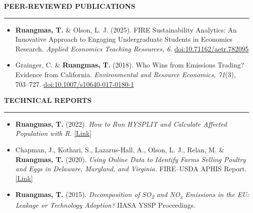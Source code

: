 \documentclass[11pt,letterpaper]{article}
\renewcommand{\section}[1]{%
  \par\vspace{10pt}%
  {\large\bfseries\color{accent}#1}\par\vspace{-3pt}%
  {\color{accent}\rule{\linewidth}{0.6pt}}\par\vspace{4pt}}
\newcommand{\pubentry}[1]{\item #1}
\begin{document}
\section{PEER-REVIEWED PUBLICATIONS}
\begin{itemize}
  \pubentry{\textbf{Ruangmas, T.} \& Olson, L. J. (2025). FIRE Sustainability Analytics: An Innovative Approach to Engaging Undergraduate Students in Economics Research. \textit{Applied Economics Teaching Resources, 6}. \href{https://doi.org/10.71162/aetr.782095}{doi:10.71162/aetr.782095}}
  \pubentry{Grainger, C. \& \textbf{Ruangmas, T.} (2018). Who Wins from Emissions Trading? Evidence from California. \textit{Environmental and Resource Economics, 71}(3), 703--727. \href{https://doi.org/10.1007/s10640-017-0180-1}{doi:10.1007/s10640-017-0180-1}}
\end{itemize}

\section{TECHNICAL REPORTS}
\begin{itemize}

\pubentry{\textbf{Ruangmas, T.} (2022). \textit{How to Run HYSPLIT and Calculate Affected Population with R.} 
\href{https://ruangmas.github.io/hysplit.html}{[Link]}} 

  \pubentry{Chapman, J., Kothari, S., Lazarus-Hall, A., Olson, L. J., Relan, M. \& \textbf{Ruangmas, T.} (2020). \textit{Using Online Data to Identify Farms Selling Poultry and Eggs in Delaware, Maryland, and Virginia.} FIRE--USDA APHIS Report. \href{https://drive.google.com/file/d/1tEazLXx8xA6s9KPVHxVDIlz273T3Oy9N/view?usp=drive_link}{[Link]}}
  \pubentry{\textbf{Ruangmas, T.} (2015). \textit{Decomposition of SO\textsubscript{2} and NO\textsubscript{x} Emissions in the EU: Leakage or Technology Adoption?} IIASA YSSP Proceedings.}
\end{itemize}

\end{document}
